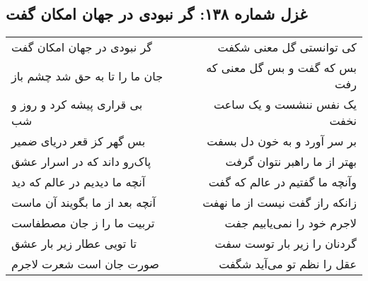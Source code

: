 \begin{center}
\section*{غزل شماره ۱۳۸: گر نبودی در جهان امکان گفت}
\label{sec:138}
\begin{longtable}{l p{0.5cm} r}
گر نبودی در جهان امکان گفت
&&
کی توانستی گل معنی شکفت
\\
جان ما را تا به حق شد چشم باز
&&
بس که گفت و بس گل معنی که رفت
\\
بی قراری پیشه کرد و روز و شب
&&
یک نفس ننشست و یک ساعت نخفت
\\
بس گهر کز قعر دریای ضمیر
&&
بر سر آورد و به خون دل بسفت
\\
پاک‌رو داند که در اسرار عشق
&&
بهتر از ما راهبر نتوان گرفت
\\
آنچه ما دیدیم در عالم که دید
&&
وآنچه ما گفتیم در عالم که گفت
\\
آنچه بعد از ما بگویند آن ماست
&&
زانکه راز گفت نیست از ما نهفت
\\
تربیت ما را ز جان مصطفاست
&&
لاجرم خود را نمی‌یابیم جفت
\\
تا تویی عطار زیر بار عشق
&&
گردنان را زیر بار توست سفت
\\
صورت جان است شعرت لاجرم
&&
عقل را نظم تو می‌آید شگفت
\\
\end{longtable}
\end{center}
